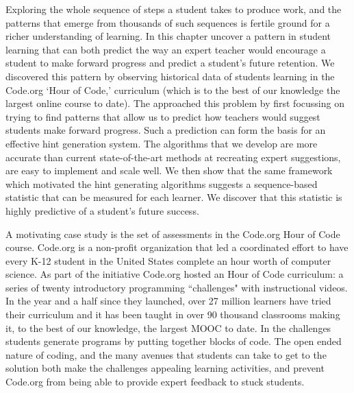 Exploring the whole sequence of steps a student takes to produce work, and the patterns that emerge from thousands of such sequences is fertile ground for a richer understanding of learning. In this chapter uncover a pattern in student learning that can both predict the way an expert teacher would encourage a student to make forward progress and predict a student's future retention. We discovered this pattern by observing historical data of students learning in the Code.org `Hour of Code,' curriculum (which is to the best of our knowledge the largest online course to date). The approached this problem by first focussing on trying to find patterns that allow us to predict how teachers would suggest students make forward progress. Such a prediction can form the basis for an effective hint generation system. The algorithms that we develop are more accurate than current state-of-the-art methods at recreating expert suggestions, are easy to implement and scale well. We then show that the same framework which motivated the hint generating algorithms suggests a sequence-based statistic that can be measured for each learner. We discover that this statistic is highly predictive of a student's future success. 

A motivating case study is the set of assessments in the Code.org Hour of Code course. Code.org is a non-profit organization that led a coordinated effort to have every K-12 student in the United States complete an hour worth of computer science. As part of the initiative Code.org hosted an Hour of Code curriculum: a series of twenty introductory programming ``challenges" with instructional videos. In the year and a half since they launched, over 27 million learners have tried their curriculum and it has been taught in over 90 thousand classrooms making it, to the best of our knowledge, the largest MOOC to date. In the challenges students generate programs by putting together blocks of code. The open ended nature of coding, and the many avenues that students can take to get to the solution both make the challenges appealing learning activities, and prevent Code.org from being able to provide expert feedback to stuck students. 

